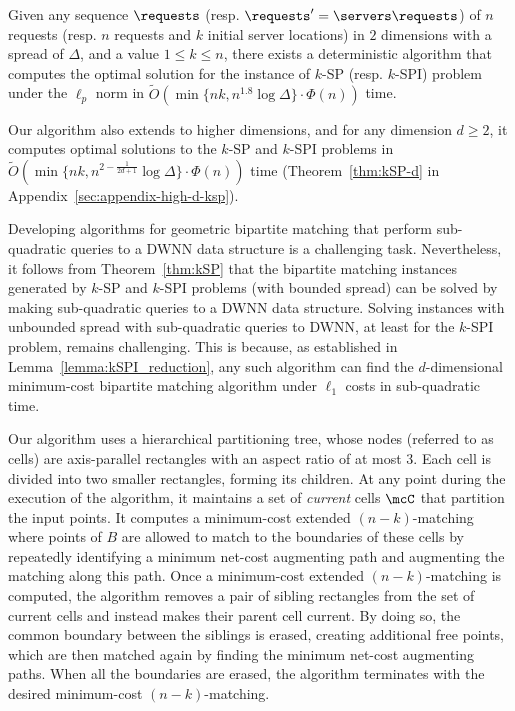%

%

\begin{theorem}\label{thm:kSP}
Given any sequence $\requests$ (resp. $\requests'=\servers\requests$) of $n$ requests (resp. $n$ requests and $k$ initial server locations) in $2$ dimensions with a spread of $\Delta$, and a value $1 \le k \le n$, there exists a deterministic algorithm that computes the optimal solution for the instance of $k$-SP (resp. $k$-SPI) problem under the $\ell_p$ norm in $\tilde{O}(\min\{nk, n^{1.8}\log \Delta\}\cdot\Phi(n))$ time.
\end{theorem}

Our algorithm also extends to higher dimensions, and for any dimension $d\ge 2$, it computes optimal solutions to the $k$-SP and $k$-SPI problems in $\tilde{O}(\min\{nk, n^{2-\frac{1}{2d+1}}\log \Delta\}\cdot\Phi(n))$ time (Theorem~\ref{thm:kSP-d} in Appendix~\ref{sec:appendix-high-d-ksp}). 
%

%

%
%
%


Developing algorithms for geometric bipartite matching that perform sub-quadratic queries to a DWNN data structure is a challenging task. Nevertheless, it follows from Theorem~\ref{thm:kSP} that the bipartite matching instances generated by $k$-SP and $k$-SPI problems (with bounded spread) can be solved by making sub-quadratic queries to a DWNN data structure. Solving instances with unbounded spread with sub-quadratic queries to DWNN, at least for the $k$-SPI problem, remains challenging. This is because, as established in Lemma~\ref{lemma:kSPI_reduction}, any such  
algorithm can find the $d$-dimensional minimum-cost bipartite matching algorithm under $\ell_1$ costs in sub-quadratic time.  

%
%
%
%

Our algorithm uses a hierarchical partitioning tree, whose nodes (referred to as cells) are axis-parallel rectangles with an aspect ratio of at most $3$. Each cell is divided into two smaller rectangles, forming its children. At any point during the execution of the algorithm, it maintains a set of \emph{current} cells $\mcC$ that partition the input points. It computes a minimum-cost extended $(n-k)$-matching where points of $B$ are allowed to match to the boundaries of these cells by repeatedly identifying a minimum net-cost augmenting path and augmenting the matching along this path.  Once a minimum-cost extended $(n-k)$-matching is computed, the algorithm removes a pair of sibling rectangles from the set of current cells and instead makes their parent cell current. By doing so, the common boundary between the siblings is erased, creating additional free points, which are then matched again by finding the minimum net-cost augmenting paths. When all the boundaries are erased, the algorithm terminates with the desired minimum-cost $(n-k)$-matching. 

